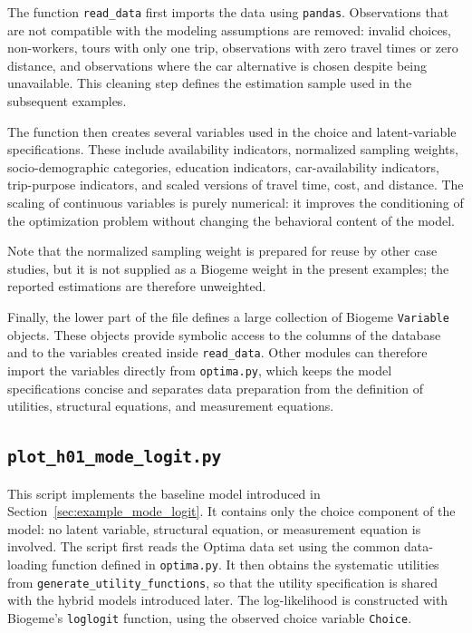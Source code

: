 \documentclass[12pt,a4paper]{article}
\begin{document}
The function \lstinline$read_data$ first imports the data using
\lstinline$pandas$. Observations that are not compatible with the
modeling assumptions are removed: invalid choices, non-workers, tours
with only one trip, observations with zero travel times or zero
distance, and observations where the car alternative is chosen despite
being unavailable. This cleaning step defines the estimation sample
used in the subsequent examples.

The function then creates several variables used in the choice and
latent-variable specifications. These include availability indicators,
normalized sampling weights, socio-demographic categories, education
indicators, car-availability indicators, trip-purpose indicators, and
scaled versions of travel time, cost, and distance. The scaling of
continuous variables is purely numerical: it improves the conditioning
of the optimization problem without changing the behavioral content of
the model.

Note that the normalized sampling weight is prepared for reuse by
other case studies, but it is not supplied as a Biogeme weight in the
present examples; the reported estimations are therefore unweighted.

Finally, the lower part of the file defines a large collection of
Biogeme \lstinline$Variable$ objects. These objects provide symbolic
access to the columns of the database and to the variables created
inside \lstinline$read_data$. Other modules can therefore import the
variables directly from \lstinline$optima.py$, which keeps the model
specifications concise and separates data preparation from the
definition of utilities, structural equations, and measurement
equations.

\subsection{\lstinline$plot_h01_mode_logit.py$}
\label{sec:plot_h01_mode_logit.py}


This script implements the baseline model introduced in
Section~\ref{sec:example_mode_logit}. It contains only the choice
component of the model: no latent variable, structural equation, or
measurement equation is involved. The script first reads the Optima
data set using the common data-loading function defined in
\lstinline$optima.py$. It then obtains the systematic utilities from
\lstinline$generate_utility_functions$, so that the utility
specification is shared with the hybrid models introduced later. The
log-likelihood is constructed with Biogeme's \lstinline$loglogit$
function, using the observed choice variable \lstinline$Choice$.
\end{document}
